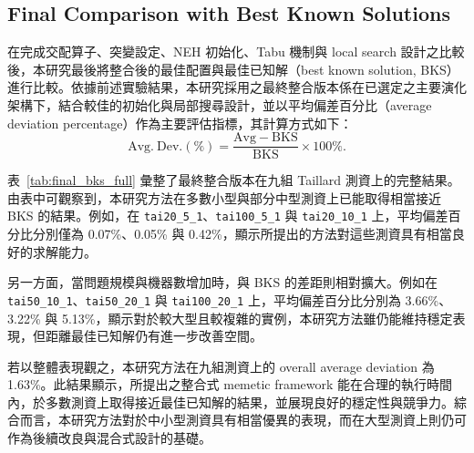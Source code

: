 \documentclass[conference]{IEEEtran}
\begin{document}
\subsection{Final Comparison with Best Known Solutions}

在完成交配算子、突變設定、NEH 初始化、Tabu 機制與 local search 設計之比較後，本研究最後將整合後的最佳配置與最佳已知解（best known solution, BKS）進行比較。依據前述實驗結果，本研究採用之最終整合版本係在已選定之主要演化架構下，結合較佳的初始化與局部搜尋設計，並以平均偏差百分比（average deviation percentage）作為主要評估指標，其計算方式如下：
\[
\mathrm{Avg.\ Dev.(\%)}=\frac{\mathrm{Avg}-\mathrm{BKS}}{\mathrm{BKS}}\times 100\%.
\]

表~\ref{tab:final_bks_full} 彙整了最終整合版本在九組 Taillard 測資上的完整結果。由表中可觀察到，本研究方法在多數小型與部分中型測資上已能取得相當接近 BKS 的結果。例如，在 \texttt{tai20\_5\_1}、\texttt{tai100\_5\_1} 與 \texttt{tai20\_10\_1} 上，平均偏差百分比分別僅為 0.07\%、0.05\% 與 0.42\%，顯示所提出的方法對這些測資具有相當良好的求解能力。

另一方面，當問題規模與機器數增加時，與 BKS 的差距則相對擴大。例如在 \texttt{tai50\_10\_1}、\texttt{tai50\_20\_1} 與 \texttt{tai100\_20\_1} 上，平均偏差百分比分別為 3.66\%、3.22\% 與 5.13\%，顯示對於較大型且較複雜的實例，本研究方法雖仍能維持穩定表現，但距離最佳已知解仍有進一步改善空間。

若以整體表現觀之，本研究方法在九組測資上的 overall average deviation 為 1.63\%。此結果顯示，所提出之整合式 memetic framework 能在合理的執行時間內，於多數測資上取得接近最佳已知解的結果，並展現良好的穩定性與競爭力。綜合而言，本研究方法對於中小型測資具有相當優異的表現，而在大型測資上則仍可作為後續改良與混合式設計的基礎。
\end{document}
